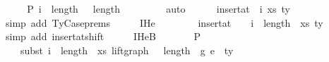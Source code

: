 \begin{isabellebody}
\ \ \isamarkupfalse%
\ \isamarkupfalse%
\ P{}{\isacharcolon}{\kern0pt}\ {\isachardoublequoteopen}i\ {\isacharplus}{\kern0pt}\ length\ {\isasymGamma}{}{\isacharprime}{\kern0pt}\ {\isasymle}\ length\ {\isacharparenleft}{\kern0pt}{\isasymGamma}{}{\isacharprime}{\kern0pt}\ {\isacharat}{\kern0pt}\ {\isasymGamma}{}{\isacharparenright}{\kern0pt}{\isachardoublequoteclose}\isanewline
\ \ \ \ \isamarkupfalse%
\ auto\isanewline
\isanewline
\isanewline
\ \ \isamarkupfalse%
\ {\isachardoublequoteopen}{\isasymGamma}\ {\isacharequal}{\kern0pt}\ insert{\isacharunderscore}{\kern0pt}at\ {\isasymGamma}{}\ i\ {\isacharparenleft}{\kern0pt}xs{\isacharcomma}{\kern0pt}\ ty{}{\isacharparenright}{\kern0pt}{\isachardoublequoteclose}\isanewline
\ \ \ \ \isamarkupfalse%
\ {\isacharparenleft}{\kern0pt}simp\ add{\isacharcolon}{\kern0pt}\ TyCase{\isachardot}{\kern0pt}prems{\isacharparenleft}{\kern0pt}{}{\isacharparenright}{\kern0pt}{\isacharparenright}{\kern0pt}\isanewline
\ \ \isamarkupfalse%
\ \isamarkupfalse%
\ IHe{}{\isacharcolon}{\kern0pt}\isanewline
\ \ \ \ {\isachardoublequoteopen}{\isasymGamma}{}{\isacharprime}{\kern0pt}\ {\isacharat}{\kern0pt}\ {\isasymGamma}\ {\isacharequal}{\kern0pt}\ insert{\isacharunderscore}{\kern0pt}at\ {\isacharparenleft}{\kern0pt}{\isasymGamma}{}{\isacharprime}{\kern0pt}\ {\isacharat}{\kern0pt}\ {\isasymGamma}{}{\isacharparenright}{\kern0pt}\ {\isacharparenleft}{\kern0pt}i\ {\isacharplus}{\kern0pt}\ length\ {\isasymGamma}{}{\isacharprime}{\kern0pt}{\isacharparenright}{\kern0pt}\ {\isacharparenleft}{\kern0pt}xs{\isacharcomma}{\kern0pt}\ ty{}{\isacharparenright}{\kern0pt}{\isachardoublequoteclose}\isanewline
\ \ \ \ \isamarkupfalse%
\ {\isacharparenleft}{\kern0pt}simp\ add{\isacharcolon}{\kern0pt}\ insert{\isacharunderscore}{\kern0pt}at{\isacharunderscore}{\kern0pt}shift{\isacharparenright}{\kern0pt}\isanewline
\ \ \isamarkupfalse%
\ \isamarkupfalse%
\ IHe{}B{\isacharcolon}{\kern0pt}\isanewline
\ \ \ \ {\isachardoublequoteopen}{\isasymGamma}{}{\isacharprime}{\kern0pt}\ {\isacharat}{\kern0pt}\ {\isasymGamma}{}\ {\isasymturnstile}{\isacharbraceleft}{\kern0pt}P{\isacharbraceright}{\kern0pt}\isanewline
\ \ \ \ subst\ {\isacharparenleft}{\kern0pt}i\ {\isacharplus}{\kern0pt}\ length\ {\isasymGamma}{}{\isacharprime}{\kern0pt}{\isacharparenright}{\kern0pt}\ xs\ {\isacharparenleft}{\kern0pt}{\isacharparenleft}{\kern0pt}lift{\isacharunderscore}{\kern0pt}graph\ {}\ {\isacharcircum}{\kern0pt}{\isacharcircum}{\kern0pt}\ {\isacharparenleft}{\kern0pt}length\ {\isasymGamma}{}{\isacharprime}{\kern0pt}{\isacharparenright}{\kern0pt}{\isacharparenright}{\kern0pt}\ g{}{\isacharparenright}{\kern0pt}\ e{}\ {\isacharcolon}{\kern0pt}\ ty{}{\isacharprime}{\kern0pt}{\isachardoublequoteclose}\isanewline

\end{isabellebody}
